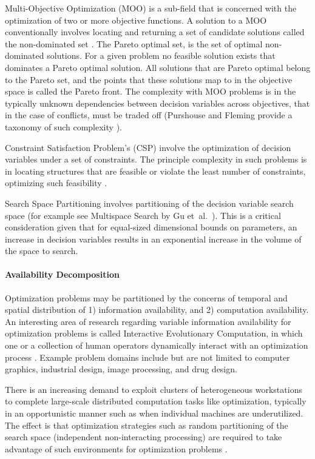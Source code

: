 Multi-Objective Optimization (MOO) is a sub-field that is concerned with the optimization of two or more objective functions. A solution to a MOO conventionally involves locating and returning a set of candidate solutions called the non-dominated set \cite{Deb2001}. The Pareto optimal set, is the set of optimal non-dominated solutions. For a given problem no feasible solution exists that dominates a Pareto optimal solution. All solutions that are Pareto optimal belong to the Pareto set, and the points that these solutions map to in the objective space is called the Pareto front. The complexity with MOO problems is in the typically unknown dependencies between decision variables across objectives, that in the case of conflicts, must be traded off (Purshouse and Fleming provide a taxonomy of such complexity \cite{Purshouse2003}). 

Constraint Satisfaction Problem's (CSP) involve the optimization of decision variables under a set of constraints. The principle complexity in such problems is in locating structures that are feasible or violate the least number of constraints, optimizing such feasibility \cite{Tsang1993, Kumar1992}. 

Search Space Partitioning involves partitioning of the decision variable search space (for example see Multispace Search by Gu et~al.\ \cite{Du1997, Gu1997, Gu1994}). This is a critical consideration given that for equal-sized dimensional bounds on parameters, an increase in decision variables results in an exponential increase in the volume of the space to search.
			
\paragraph{Availability Decomposition}
Optimization problems may be partitioned by the concerns of temporal and spatial distribution of 1) information availability, and 2) computation availability. An interesting area of research regarding variable information availability for optimization problems is called Interactive Evolutionary Computation, in which one or a collection of human operators dynamically interact with an optimization process \cite{Takagi2001}. Example problem domains include but are not limited to computer graphics, industrial design, image processing, and drug design. 

There is an increasing demand to exploit clusters of heterogeneous workstations to complete large-scale distributed computation tasks like optimization, typically in an opportunistic manner such as when individual machines are underutilized. The effect is that optimization strategies such as random partitioning of the search space (independent non-interacting processing) are required to take advantage of such environments for optimization problems \cite{Schnekenburger1993, Liu2000}.
	
